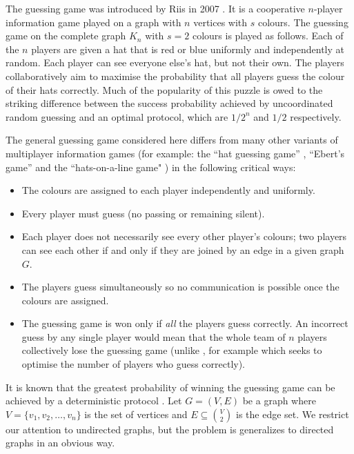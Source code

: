 \documentclass{birkjour}
\theoremstyle{indenteddefinition}
\theoremstyle{indenteddefinition}
\numberwithin{equation}{section}
\begin{document}
The guessing game was introduced by Riis in 2007 \cite{Riis2007information}. It is a cooperative $n$-player information game played on a graph with $n$ vertices with $s$ colours. The guessing game on the complete graph $K_n$ with $s=2$ colours is played as follows. Each of the $n$ players are given a hat that is red or blue uniformly and independently at random. Each player can see everyone else's hat, but not their own. The players collaboratively aim to maximise the probability that all players guess the colour of their hats correctly. Much of the popularity of this puzzle is owed to the striking difference between the success probability achieved by uncoordinated random guessing and an optimal protocol, which are $1/2^n$ and $1/2$ respectively. 

The general guessing game considered here differs from many other variants of multiplayer information games (for example: the ``hat guessing game'' \cite{Butler2009hat}, ``Ebert's game'' \cite{Ebert1998applications} and the ``hats-on-a-line game" \cite{Patterson2010another}) in the following critical ways:
	\begin{itemize}
	\item The colours are assigned to each player independently and uniformly.
	\item Every player must guess (no passing or remaining silent).
	\item Each player does not necessarily see every other player's colours; two players can see each other if and only if they are joined by an edge in a given graph $G$.
	\item The players guess simultaneously so no communication is possible once the colours are assigned. 
	\item The guessing game is won only if \emph{all} the players guess correctly. An incorrect guess by any single player would mean that the whole team of $n$ players collectively lose the guessing game (unlike \cite{Butler2009hat}, for example which seeks to optimise the number of players who guess correctly).
	\end{itemize}
It is known that the greatest probability of winning the guessing game can be achieved by a deterministic protocol \cite{Cameron2014guessing}. Let $G = (V,E)$ be a graph where $V = \{ v_1,v_2, \ldots ,v_n \}$ is the set of vertices and $E \subseteq \binom{V}{2}$ is the edge set. We restrict our attention to undirected graphs, but the problem is generalizes to directed graphs in an obvious way.
\end{document}
